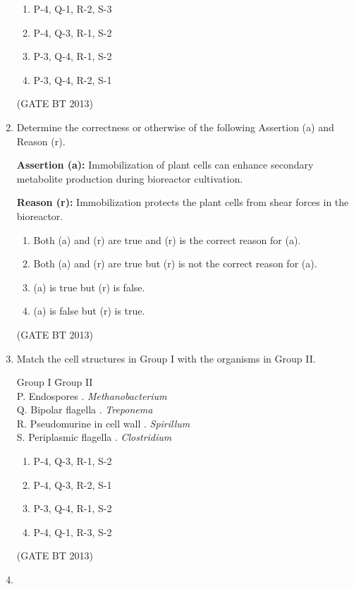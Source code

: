 \documentclass[journal,12pt,onecolumn]{IEEEtran}
\theoremstyle{remark}
\begin{document}
\begin{enumerate}
\begin{enumerate}
    \item P-4, Q-1, R-2, S-3
    \item P-4, Q-3, R-1, S-2
    \item P-3, Q-4, R-1, S-2
    \item P-3, Q-4, R-2, S-1
\end{enumerate} 
\hfill (GATE BT 2013)
\item 

Determine the correctness or otherwise of the following Assertion (a) and Reason (r).

\textbf{Assertion (a):} Immobilization of plant cells can enhance secondary metabolite production during bioreactor cultivation.

\textbf{Reason (r):} Immobilization protects the plant cells from shear forces in the bioreactor.

\begin{enumerate}
    \item Both (a) and (r) are true and (r) is the correct reason for (a).
    \item Both (a) and (r) are true but (r) is not the correct reason for (a).
    \item (a) is true but (r) is false.
    \item (a) is false but (r) is true.
\end{enumerate} 
\hfill (GATE BT 2013)
\item 

Match the cell structures in Group I with the organisms in Group II.

\begin{tabbing}
Group I \hspace{3.5cm} \= Group II \\
P. Endospores . \textit{Methanobacterium} \\
Q. Bipolar flagella . \textit{Treponema} \\
R. Pseudomurine in cell wall . \textit{Spirillum} \\
S. Periplasmic flagella . \textit{Clostridium} \\
\end{tabbing}

\begin{enumerate}
    \item P-4, Q-3, R-1, S-2
    \item P-4, Q-3, R-2, S-1
    \item P-3, Q-4, R-1, S-2
    \item P-4, Q-1, R-3, S-2
\end{enumerate} 
\hfill (GATE BT 2013)
\item 


\end{enumerate}
\end{document}
